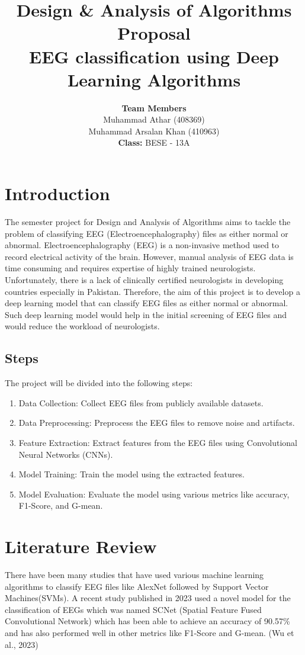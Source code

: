 \documentclass[11pt]{article}
\title{\textbf{Design \& Analysis of Algorithms Proposal \\ \vspace{5mm} EEG classification using Deep Learning Algorithms}}
\author{\textbf{Team Members} \vspace{1mm} \\ Muhammad Athar (408369) \\ Muhammad Arsalan Khan (410963) \vspace{5mm} \\ \textbf{Class: }BESE - 13A}
\begin{document}
\maketitle

\justifying
\section{Introduction}
The semester project for Design and Analysis of Algorithms aims to tackle the problem of classifying EEG (Electroencephalography) files as either normal or abnormal.
Electroencephalography (EEG) is a non-invasive method used to record electrical activity of the brain. However, manual analysis of EEG data is time consuming and requires expertise of highly trained neurologists. Unfortunately, there is a lack of clinically certified neurologists in developing countries especially in Pakistan. Therefore, the aim of this project is to develop a deep learning model that can classify EEG files as either normal or abnormal. Such deep learning model would help in the initial screening of EEG files and would reduce the workload of neurologists.

\subsection{Steps}
The project will be divided into the following steps:
\begin{enumerate}
    \item Data Collection: Collect EEG files from publicly available datasets.
    \item Data Preprocessing: Preprocess the EEG files to remove noise and artifacts.
    \item Feature Extraction: Extract features from the EEG files using Convolutional Neural Networks (CNNs).
    \item Model Training: Train the model using the extracted features.
    \item Model Evaluation: Evaluate the model using various metrics like accuracy, F1-Score, and G-mean.
\end{enumerate}

\section{Literature Review}
There have been many studies that have used various machine learning algorithms to classify EEG files like AlexNet followed by Support Vector Machines(SVMs). A recent study published in 2023 used a novel model for the classification of EEGs which was named SCNet (Spatial Feature Fused Convolutional Network) which has been able to achieve an accuracy of 90.57\% and has also performed well in other metrics like F1-Score and G-mean. (Wu et al., 2023)
\end{document}

